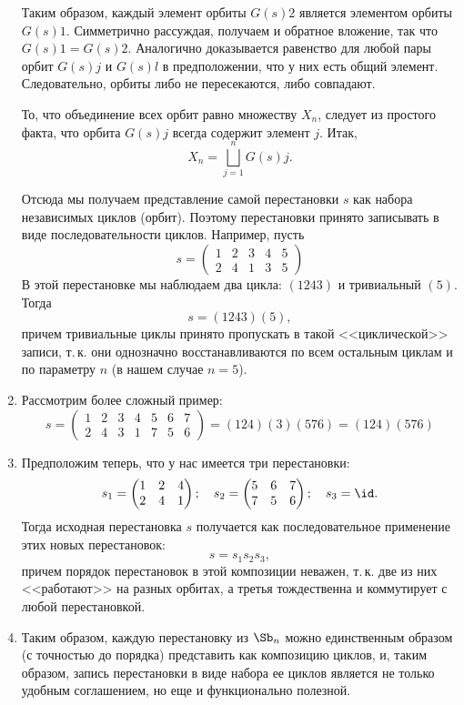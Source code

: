 \begin{enumerate}
Таким образом, каждый элемент орбиты $G(s)2$ является элементом орбиты $G(s)1$. Симметрично рассуждая, получаем и обратное вложение, так что $G(s)1=G(s)2$. Аналогично доказывается равенство для любой пары орбит $G(s)j$ и $G(s)l$ в предположении, что у них есть общий элемент. Следовательно, орбиты либо не пересекаются, либо совпадают.

То, что объединение всех орбит равно множеству $X_n$, следует из простого факта, что орбита $G(s)j$ всегда содержит элемент $j$. Итак,
$$
X_n = \bigsqcup_{j=1}^n G(s)j.
$$

Отсюда мы получаем представление самой перестановки $s$ как набора независимых циклов (орбит). Поэтому перестановки принято записывать в виде последовательности циклов. Например, пусть
$$
s=
\begin{pmatrix}
1 & 2 & 3 & 4 & 5 \\
2 & 4 & 1 & 3 & 5
\end{pmatrix}
$$
В этой перестановке мы наблюдаем два цикла: $(1 2 4 3)$ и тривиальный $(5)$. Тогда
$$
s=(1 2 4 3)(5),
$$
причем тривиальные циклы принято пропускать в такой <<циклической>> записи, т.\,к. они однозначно восстанавливаются по всем остальным циклам и по параметру $n$ (в нашем случае $n=5$).
\item Рассмотрим более сложный пример:
$$
s=
\begin{pmatrix}
1 & 2 & 3 & 4 & 5 & 6 & 7 \\
2 & 4 & 3 & 1 & 7 & 5 & 6
\end{pmatrix}
=(1 2 4)(3)(5 7 6)=(1 2 4)(5 7 6)
$$

\item Предположим теперь, что у нас имеется три перестановки:
$$
s_1=
\begin{pmatrix}
1 & 2 & 4 \\
2 & 4 & 1
\end{pmatrix};
\quad s_2=
\begin{pmatrix}
5 & 6 & 7 \\
7 & 5 & 6
\end{pmatrix};
\quad s_3=\id.
$$
Тогда исходная перестановка $s$ получается как последовательное применение этих новых перестановок:
$$
s=s_1s_2s_3,
$$
причем порядок перестановок в этой композиции неважен, т.\,к. две из них <<работают>> на разных орбитах, а третья тождественна и коммутирует с любой перестановкой.

\item Таким образом, каждую перестановку из $\Sb_n$ можно единственным образом (с точностью до порядка) представить как композицию циклов, и, таким образом, запись перестановки в виде набора ее циклов является не только удобным соглашением, но еще и функционально полезной.

\end{enumerate}




